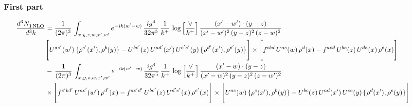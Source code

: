 \documentclass[9pt]{article}
\numberwithin{equation}{section}
\begin{document}
\subsubsection{First part}
\begin{align}
 \frac{d^{3}N_{1\,\rm NLO}^{\rm}}{d^{3}k}  & =    \frac{1}{(2\pi)^{3}}\,\int_{x,y,z,w,x',w^{\prime}} e^{-ik(w^{\prime}-w)}\, \frac{ig^{4}}{32\pi^{5}}\,\frac{1}{k^{+}}\,\log{\left[\frac{\vee}{ k^{+}}\right]}\, \frac{(x'-w')\cdot (y-z)}{(x'-w')^{2}\,(y-z)^{2}\,(z-w)^{2}}\notag \\ &  \Bigg[U^{ac'}(w')\,\{\rho^{c'}(x'),\rho^{b}(y)\}-U^{bc'}(z)\,U^{ad'}(x')\,U^{c'e'}(y)\, \{\rho^{d'}(x'),\rho^{e'}(y)\}\Bigg]\times \Bigg[f^{cbd}\,U^{ac}(w)\,\rho^{d}(x)-f^{acd}\, U^{bc}(z)\,U^{de}(x)\,\rho^{e}(x)\Bigg]\notag \\ & -\, \frac{1}{(2\pi)^{3}}\,\int_{x,y,z,w,x',w^{\prime}} e^{-ik(w^{\prime}-w)}\,\frac{ig^{4}}{32\pi^{5}}\,\frac{1}{k^{+}}\,\log{\left[\frac{\vee}{k^{+}}\right]}\, \frac{(x'-w)\cdot (y-z)}{(x'-w)^{2}\,(y-z)^{2}\,(z-w')^{2}}\notag \\ &  \times\Bigg[f^{c'bd'}\,U^{ac'}(w')\,\rho^{d'}(x)-f^{ac'd'}\, U^{bc'}(z)\,U^{d'e'}(x)\,\rho^{e'}(x)\Bigg] \times \Bigg[U^{ac}(w)\,\{\rho^{c}(x'),\rho^{b}(y)\}-U^{bc}(z)\,U^{ad}(x')\,U^{ce}(y)\, \{\rho^{d}(x'),\rho^{e}(y)\}\Bigg]
\end{align}
\end{document}
